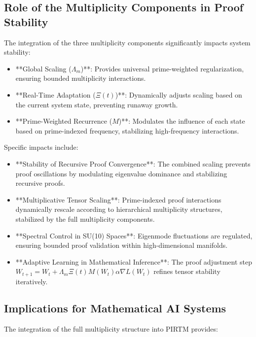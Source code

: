 \documentclass[12pt]{article}
\theoremstyle{plain}
\begin{document}
\subsection{Role of the Multiplicity Components in Proof Stability}

The integration of the three multiplicity components significantly impacts system stability:

\begin{itemize}
    \item **Global Scaling (\(\Lambda_m\))**: Provides universal prime-weighted regularization, ensuring bounded multiplicity interactions.
    \item **Real-Time Adaptation (\(\Xi(t)\))**: Dynamically adjusts scaling based on the current system state, preventing runaway growth.
    \item **Prime-Weighted Recurrence (\(M\))**: Modulates the influence of each state based on prime-indexed frequency, stabilizing high-frequency interactions.
\end{itemize}

Specific impacts include:

\begin{itemize}
    \item **Stability of Recursive Proof Convergence**: The combined scaling prevents proof oscillations by modulating eigenvalue dominance and stabilizing recursive proofs.
    \item **Multiplicative Tensor Scaling**: Prime-indexed proof interactions dynamically rescale according to hierarchical multiplicity structures, stabilized by the full multiplicity components.
    \item **Spectral Control in SU(10) Spaces**: Eigenmode fluctuations are regulated, ensuring bounded proof validation within high-dimensional manifolds.
    \item **Adaptive Learning in Mathematical Inference**: The proof adjustment step \( W_{t+1} = W_t + \Lambda_m \Xi(t) M(W_t) \alpha \nabla L(W_t) \) refines tensor stability iteratively.
\end{itemize}

\subsection{Implications for Mathematical AI Systems}

The integration of the full multiplicity structure into PIRTM provides:
\end{document}

